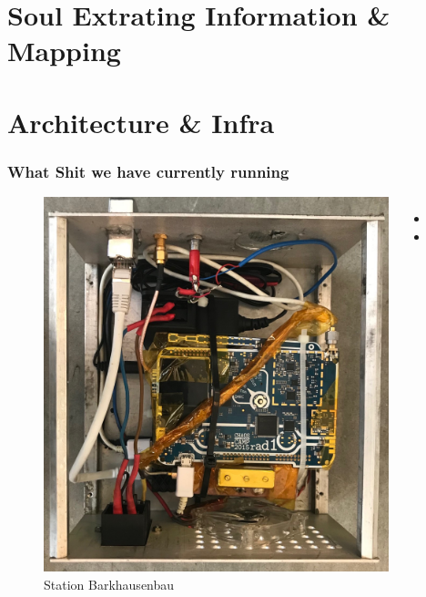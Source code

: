 \documentclass[aspectratio=169]{beamer}
\begin{document}

\section{Soul Extrating Information \& Mapping }




\section{Architecture \& Infra }


\begin{frame}
\frametitle{What Shit we have currently running}

\begin{figure}
\begin{columns}
\begin{center}
\includegraphics[height=0.7\textheight]{figs/station_barkhausen.jpg}
\end{center}
\raggedright
\caption{Station Barkhausenbau}
\vspace{0.5cm}
\begin{itemize}
	\item{}
	\item{}
\end{itemize}
\end{columns}
\end{figure}

\end{frame}
\end{document}
